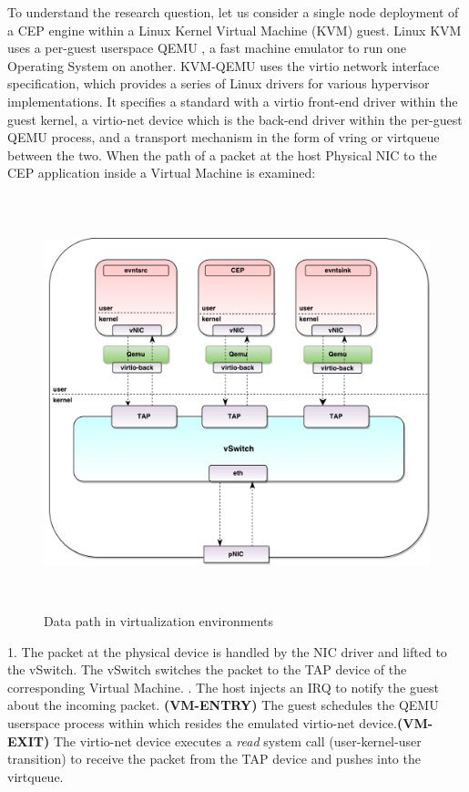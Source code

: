 To understand the research question, let us consider a single node deployment of a CEP engine within a Linux Kernel Virtual Machine (KVM) \cite{kivity2007kvm} guest. Linux KVM uses a per-guest userspace QEMU \cite{bellard2005qemu}, a fast machine emulator to run one Operating System on another. KVM-QEMU uses the virtio \cite{russell2008virtio} network interface specification, which provides a series of Linux drivers for various hypervisor implementations. It specifies a standard with a virtio front-end driver within the guest kernel, a virtio-net device which is the back-end driver within the per-guest QEMU process, and a transport mechanism in the form of vring or virtqueue between the two. When the path of a packet at the host Physical NIC to the CEP application inside a Virtual Machine is examined: 
 \begin{figure}[H]
 \centering
 \caption{Data path in virtualization environments} 
 \includegraphics[height=12cm]{Vswitch05.pdf}
\end{figure}
1. The packet at the physical device is handled by the NIC driver and lifted to the vSwitch. The vSwitch switches the packet to the TAP device of the corresponding Virtual Machine. \newline {}. The host injects an IRQ to notify the guest about the incoming packet. \textbf{(VM-ENTRY)} The guest schedules the QEMU userspace process within which resides  the emulated virtio-net device.\textbf{(VM-EXIT)} The virtio-net device executes a \textit{read} system call (user-kernel-user transition) to receive the packet from the TAP device and pushes into the virtqueue.   \newline \newline 
